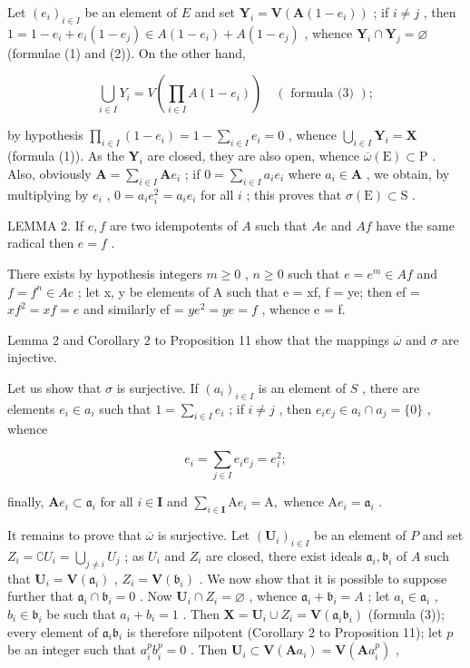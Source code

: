 Let \((e_i)_{i\in I}\) be an element of \(E\) and set \(\mathbf{Y}_i = \mathbf{V}(\mathbf{A}(1 - e_i))\) ; if \(i\neq j\) , then \(1 = 1 - e_i + e_i(1 - e_j)\in A(1 - e_i) + A(1 - e_j)\) , whence \(\mathbf{Y}_i\cap \mathbf{Y}_j = \varnothing\) (formulae (1) and (2)). On the other hand,

\[
\bigcup_ {i \in I} Y _ {i} = V \left(\prod_ {i \in I} A (1 - e _ {i})\right) \quad (\text { formula   (3) });
\]

by hypothesis \(\prod_{i\in I}(1 - e_i) = 1 - \sum_{i\in I}e_i = 0\) , whence \(\bigcup_{i\in I}\mathbf{Y}_i = \mathbf{X}\) (formula (1)). As the \(\mathbf{Y}_i\) are closed, they are also open, whence \(\overline{\omega} (\mathrm{E})\subset \mathrm{P}\) . Also, obviously \(\mathbf{A} = \sum_{i\in I}\mathbf{A}e_i\) ; if \(0 = \sum_{i\in I}a_{i}e_{i}\) where \(a_{i}\in \mathbf{A}\) , we obtain, by multiplying by \(e_i\) , \(0 = a_i e_i^2 = a_i e_i\) for all \(i\) ; this proves that \(\sigma (\mathrm{E})\subset \mathrm{S}\) .

LEMMA 2. If \(e, f\) are two idempotents of \(A\) such that \(Ae\) and \(Af\) have the same radical then \(e = f\) .

There exists by hypothesis integers \(m \geqslant 0\) , \(n \geqslant 0\) such that \(e = e^{m} \in Af\) and \(f = f^{n} \in Ae\) ; let x, y be elements of A such that e = xf, f = ye; then ef = \(xf^{2} = xf = e\) and similarly ef = \(ye^{2} = ye = f\) , whence e = f.

Lemma 2 and Corollary 2 to Proposition 11 show that the mappings \(\overline{\omega}\) and \(\sigma\) are injective.

Let us show that \(\sigma\) is surjective. If \((a_{i})_{i\in I}\) is an element of \(S\) , there are elements \(e_i\in a_i\) such that \(1 = \sum_{i\in I}e_i\) ; if \(i\neq j\) , then \(e_i e_j\in a_i\cap a_j = \{0\}\) , whence

\[
e _ {i} = \sum_ {j \in I} e _ {i} e _ {j} = e _ {i} ^ {2};
\]

finally, \(\mathbf{A}e_{i}\subset \mathfrak{a}_{i}\) for all \(i\in \mathbf{I}\) and \(\sum_{i\in \mathbf{I}}\mathrm{A}e_i = \mathrm{A},\) whence \(\mathrm{A}e_{i} = \mathfrak{a}_{i}\) .

It remains to prove that \(\overline{\omega}\) is surjective. Let \((\mathbf{U}_i)_{i\in I}\) be an element of \(P\) and set \(Z_{i} = \complement U_{i} = \bigcup_{j\neq i}U_{j}\) ; as \(U_{i}\) and \(Z_{i}\) are closed, there exist ideals \(\mathfrak{a}_i,\mathfrak{b}_i\) of \(A\) such that \(\mathbf{U}_i = \mathbf{V}(\mathfrak{a}_i)\) , \(Z_{i} = \mathbf{V}(\mathfrak{b}_{i})\) . We now show that it is possible to suppose further that \(\mathfrak{a}_i\cap \mathfrak{b}_i = 0\) . Now \(\mathbf{U}_i\cap Z_i = \varnothing\) , whence \(\mathfrak{a}_i + \mathfrak{b}_i = A\) ; let \(a_i\in \mathfrak{a}_i\) , \(b_{i}\in \mathfrak{b}_{i}\) be such that \(a_{i} + b_{i} = 1\) . Then \(\mathbf{X} = \mathbf{U}_i\cup Z_i = \mathbf{V}(\mathfrak{a}_i\mathfrak{b}_i)\) (formula (3)); every element of \(\mathfrak{a}_i\mathfrak{b}_i\) is therefore nilpotent (Corollary 2 to Proposition 11); let \(p\) be an integer such that \(a_i^p b_i^p = 0\) . Then \(\mathbf{U}_i\subset \mathbf{V}(\mathbf{A}a_i) = \mathbf{V}(\mathbf{A}a_i^p)\) ,

